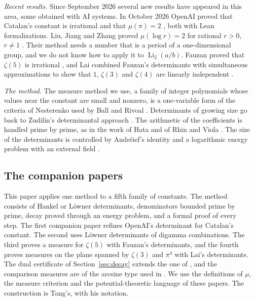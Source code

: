 \documentclass[11pt]{amsart}
\theoremstyle{definition}
\theoremstyle{remark}
\numberwithin{equation}{section}
\newcommand{\Li}{\operatorname{Li}}
\begin{document}
\emph{Recent results.} Since September 2026 several new results have appeared in this area, some obtained with AI
systems. In October 2026 OpenAI proved that Catalan's constant is irrational \cite{OpenAI2026} and that $\mu(\pi)=2$
\cite{OpenAIPi2026}, both with Lean formalizations. Liu, Jiang and Zhang proved $\mu(\log r)=2$ for rational $r>0$,
$r\ne1$ \cite{LiuJiangZhang26}. Their method needs a number that is a period of a one-dimensional group, and we do
not know how to apply it to $\Li_2(a/b)$. Fauzan proved that $\zeta(5)$ is irrational \cite{Fauzan2026}, and Lai
combined Fauzan's determinants with simultaneous approximations to show that $1$, $\zeta(3)$ and $\zeta(4)$ are
linearly independent \cite{Lai2026}.

\emph{The method.} The measure method we use, a family of integer polynomials whose values near the constant are
small and nonzero, is a one-variable form of the criteria of Nesterenko \cite{Nesterenko85} used by Ball and Rivoal
\cite{BallRivoal01}. Determinants of growing size go back to Zudilin's determinantal approach \cite{Zudilin}. The
arithmetic of the coefficients is handled prime by prime, as in the work of Hata \cite{Hata93dilog} and of Rhin and
Viola \cite{RhinViola96,RhinViola05}. The size of the determinants is controlled by Andr\'eief's identity
\cite{Forrester2018Andreief} and a logarithmic energy problem with an external field \cite{SaffTotik}.

\subsection{The companion papers}
This paper applies one method to a fifth family of constants. The method consists of Hankel or L\"owner
determinants, denominators bounded prime by prime, decay proved through an energy problem, and a formal proof of every
step. The first companion paper \cite{Litsey2026} refines OpenAI's determinant for Catalan's constant. The second
\cite{Litsey2026b} uses L\"owner determinants of digamma combinations. The third \cite{Litsey2026c} proves a measure
for $\zeta(5)$ with Fauzan's determinants, and the fourth \cite{Litsey2026d} proves measures on the plane spanned by
$\zeta(3)$ and $\pi^4$ with Lai's determinants. The dual certificate of Section~\ref{sec:decay} extends the one of
\cite{Litsey2026d}, and the comparison measures are of the arcsine type used in \cite{Litsey2026c}. We use the
definitions of $\mu$, the measure criterion and the potential-theoretic language of these papers. The construction is
Tang's, with his notation.
\end{document}
